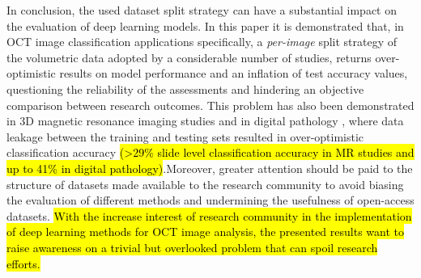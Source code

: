 \documentclass[fleqn,10pt]{wlscirep}
\begin{document}
In conclusion, the used dataset split strategy can have a substantial impact on the evaluation of deep learning models. In this paper it is demonstrated that, in OCT image classification applications specifically, a \textit{per-image} split strategy of the volumetric data adopted by a considerable number of studies, returns over-optimistic results on model performance and an inflation of test accuracy values, questioning the reliability of the assessments and hindering an objective comparison between research outcomes.  This problem has also been demonstrated in 3D magnetic resonance imaging studies \cite{yagis2021effect} and in digital pathology \cite{bussola2021ai}, where data leakage between the training and testing sets resulted in over-optimistic classification accuracy \hl{(>29\% slide level classification accuracy in MR studies and up to 41\% in digital pathology)}.Moreover, greater attention should be paid to the structure of datasets made available to the research community to avoid biasing the evaluation of different methods and undermining the usefulness of open-access datasets.  \hl{With the increase interest of research community in the implementation of deep learning methods for OCT image analysis, the presented results want to raise awareness on a trivial but overlooked problem that can spoil research efforts.}
\end{document}
